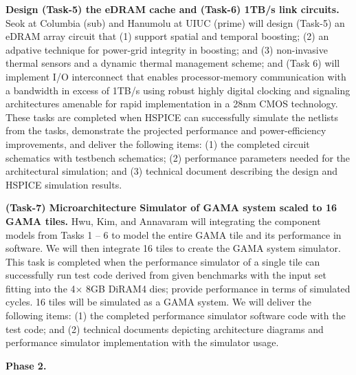 \vspace{3pt}
\noindent
\textbf{Design (Task-5) the eDRAM cache and (Task-6) 1TB/s link circuits.}
Seok at Columbia (sub) and Hanumolu at UIUC (prime) will design 
(Task-5) an eDRAM array circuit that (1) support spatial and temporal boosting; (2) an adpative technique for power-grid integrity in boosting; and (3) non-invasive thermal sensors and a dynamic thermal management scheme; and 
(Task 6) will implement I/O interconnect that enables processor-memory communication with a bandwidth in excess of 1TB/s using robust highly digital clocking and signaling architectures amenable for rapid implementation in a 28nm CMOS technology.
These tasks are completed when HSPICE can successfully simulate the netlists from the tasks, demonstrate the projected performance and power-efficiency improvements, and deliver the following items:
(1) the completed circuit schematics with testbench schematics; (2) performance parameters needed for the architectural simulation; and (3) technical document describing the design and HSPICE simulation results.


\vspace{3pt}
\noindent
\textbf{(Task-7) Microarchitecture Simulator of GAMA system scaled to 16 GAMA tiles.}
Hwu, Kim, and Annavaram will integrating the component models from Tasks 1 -- 6 to model the entire GAMA tile and its performance in software. We will then integrate 16 tiles to create the GAMA system simulator. 
This task is completed when the performance simulator of a single tile can successfully run test code derived from given benchmarks with the input set fitting into the 4$\times$ 8GB DiRAM4 dies; provide performance in terms of simulated cycles. 16 tiles will be simulated as a GAMA system. We will deliver the following items:
(1) the completed performance simulator software code with the test code; and (2) technical documents depicting architecture diagrams and performance simulator implementation with the simulator usage.


\noindent
\textbf{Phase 2.}
%


